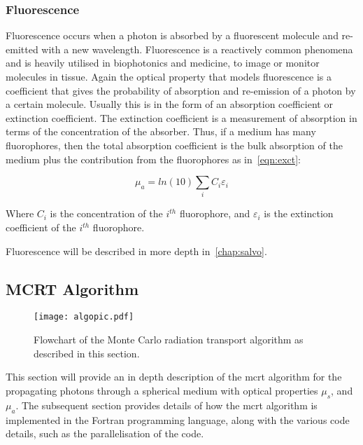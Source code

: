 \medskip

\subsubsection*{Fluorescence}



Fluorescence occurs when a photon is absorbed by a fluorescent molecule and re-emitted with a new wavelength. Fluorescence	is a reactively common phenomena and is heavily utilised in biophotonics and medicine, to image or monitor molecules in tissue. Again the optical property that models fluorescence is a coefficient that gives the probability of absorption and re-emission of a photon by a certain molecule. Usually this is in the form of an absorption coefficient or extinction coefficient. The extinction coefficient is a measurement of absorption in terms of the concentration of the absorber. Thus, if a medium has many fluorophores, then the total absorption coefficient is the bulk absorption of the medium plus the contribution from the fluorophores as in~\cref{eqn:exct}:

\begin{equation}
\mu_a=ln(10) \sum_i C_i \varepsilon_i
\label{eqn:exct}	
\end{equation}

Where $C_i$ is the concentration of the $i^{th}$ fluorophore, and $\varepsilon_i$ is the extinction coefficient of the $i^{th}$ fluorophore.

Fluorescence will be described in more depth in~\cref{chap:salvo}.
\newpage
\subsection{MCRT Algorithm}\label{sec:algorithmMCRT}

\begin{wrapfigure}{r}{.45\textwidth}
\centering
\texttt{[image: algopic.pdf]}
\caption{Flowchart of the Monte Carlo radiation transport algorithm as described in this section.}
\label{fig:algo}
\vspace{-61pt}
\end{wrapfigure}
\FloatBarrier

This section will provide an in depth description of the \gls*{mcrt} algorithm for the propagating photons through a spherical medium with optical properties $\mu_s$, and $\mu_a$. The subsequent section provides details of how the \gls*{mcrt} algorithm is implemented in the Fortran programming language, along with the various code details, such as the parallelisation of the code.

